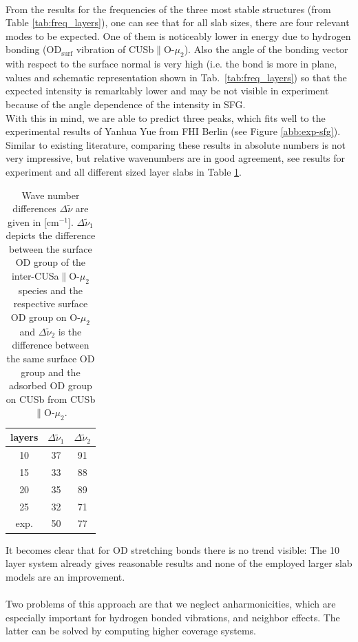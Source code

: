 \documentclass[11pt,DIV=13,BCOR=5mm,a4paper,headinclude]{scrbook}
\begin{document}
\\
From the results for the frequencies of the three most stable structures (from Table \ref{tab:freq_layers}), one can see that for all slab sizes, there are four relevant modes to be expected.
One of them is noticeably lower in energy due to hydrogen bonding (OD$_\textrm{surf}$ vibration of CUSb$\parallel$O-$\mu_2$).
Also the angle of the bonding vector with respect to the surface normal is very high (i.e.
the bond is more in plane, values and schematic representation shown in Tab.~\ref{tab:freq_layers}) so that the expected intensity is remarkably lower and may be not visible in experiment because of the angle dependence of the intensity in SFG.
\\
With this in mind, we are able to predict three peaks, which fits well to the experimental results of Yanhua Yue from FHI Berlin (see Figure \ref{abb:exp-sfg}).
Similar to existing literature\cite{Wirth2014}, comparing these results in absolute numbers is not very impressive, but relative wavenumbers are in good agreement, see results for experiment and all different sized layer slabs in Table \ref{tab:rel_modes}.
\begin{table}[!h]
\begin{center}
\caption{Wave number differences $\Delta \tilde{\nu}$ are given in [cm$^{-1}$].
$\Delta \tilde{\nu}_1$ depicts the difference between the surface OD group of the inter-CUSa$\parallel$O-$\mu_2$ species and the respective surface OD group on O-$\mu_2$ and  $\Delta \tilde{\nu}_2$ is the difference between the same surface OD group and the adsorbed OD group on CUSb from CUSb$\parallel$O-$\mu_2$.}
\begin{tabular}{ccc}
\toprule
layers & $\Delta \tilde{\nu}_1$ &  $\Delta \tilde{\nu}_2$\\\midrule
10  &37 &91 \\
15  &33 &88 \\
20  &35 &89 \\
25  &32 &71 \\\midrule
exp.&50 &77 \\\bottomrule
  \end{tabular}
\label{tab:rel_modes}
\end{center}
\end{table}
It becomes clear that for OD stretching bonds there is no trend visible: The 10 layer system already gives reasonable results and none of the employed larger slab models are an improvement.
\\
\\
Two problems of this approach are that we neglect anharmonicities, which are especially important for hydrogen bonded vibrations, and neighbor effects.
The latter can be solved by computing higher coverage systems.
\\
\end{document}
